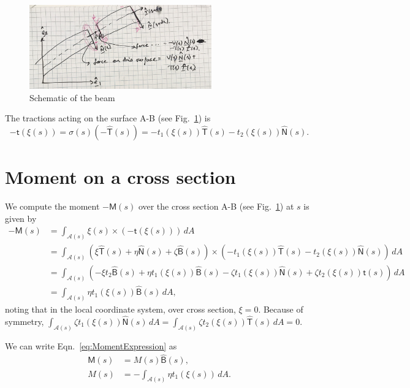 \documentclass{article}
\newcommand{\bsf}[1]{\boldsymbol{\mathsf{#1}}}
\newcommand{\hb}[1]{\hat{\bsf{#1}}}
\begin{document}
\begin{figure}[H]
\centering 
\includegraphics[width=0.7\textwidth]{Figures/Schematic.jpg}
\caption{Schematic of the beam}
\label{fig:schematic}
\end{figure}

The tractions acting on the surface  A-B (see Fig.~\ref{fig:schematic}) is 
\begin{equation}
-\bsf{t}(\bsf{\xi}(s))  = \bsf{\sigma} (s ) \left(-\hat{\bsf{T}}(s) \right) = - t_1 (\bsf{\xi}(s)) \hat{\bsf{T}}(s) - t_2 (\bsf{\xi}(s)) \hat{\bsf{N}}(s).
\end{equation}


\section{Moment on a cross section}

We compute the moment $- \bsf{M}(s) $ over the cross section  A-B (see Fig.~\ref{fig:schematic}) at $s$ is given by
\begin{align}
-\bsf{M} (s) & =   \int_{\mathcal{A}(s)} \bsf{\xi}(s) \times \left(-\bsf{t}(\bsf{\xi}(s))\right)  \, dA \\
			& =   \int_{\mathcal{A}(s)} \left( \xi \hat{\bsf{T}}(s) + \eta \hat{\bsf{N}}(s) + \zeta \hat{\bsf{B}}(s)\right) \times
			\left( - t_1(\bsf{\xi}(s)) \hat{\bsf{T}} (s)- t_2(\bsf{\xi}(s)) \hat{\bsf{N}}(s) \right) \, dA \\
			& =   \int_{\mathcal{A}(s)}  \left(- \xi  t_2\hb{B}(s) + \eta t_1(\bsf{\xi}(s)) \hb{B}(s) 
			     - \zeta t_1(\bsf{\xi}(s))\hb{N} (s)+ \zeta t_2(\bsf{\xi}(s))\bsf{t} (s) \right) \, dA \\
			& =   \int_{\mathcal{A}(s)}  \eta t_1(\bsf{\xi}(s)) \hb{B}(s)  \, dA,
			\label{eq:MomentExpression}
\end{align}
noting that in the local coordinate system, over cross section, $\xi = 0$. Because of symmetry, $\int_{\mathcal{A}(s)} \zeta t_1(\bsf{\xi}(s))\hb N (s)\, dA = \int_{\mathcal{A}(s)} \zeta t_2(\bsf{\xi}(s))\hb T(s) \, dA =  0$.

We can write Eqn.~\eqref{eq:MomentExpression} as 
\begin{align}
\bsf{M} (s)  &= M(s)   \hb{B}(s),\\
M(s) &=  -\int_{\mathcal{A}(s)}  \eta t_1(\bsf{\xi}(s))\, dA.
\label{eq:MomentScalar}
\end{align}
\end{document}
